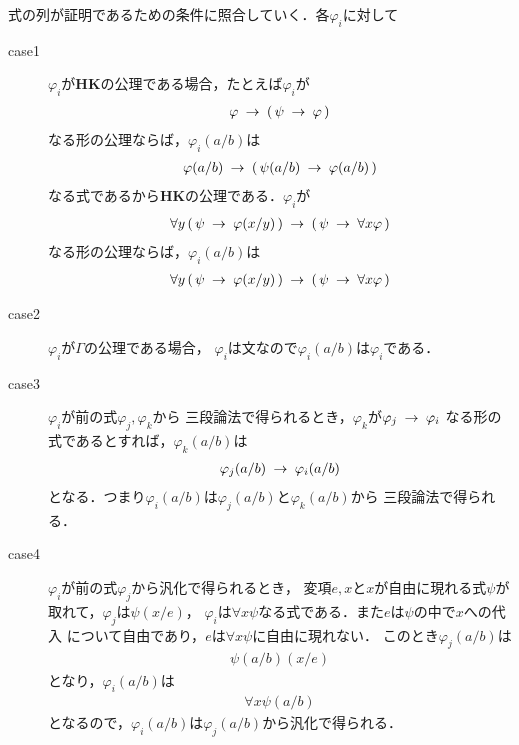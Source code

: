 	\begin{metaprf}
		式の列が証明であるための条件に照合していく．各$\varphi_{i}$に対して
		\begin{description}
			\item[case1] $\varphi_{i}$が{\bf HK}の公理である場合，たとえば$\varphi_{i}$が
				\begin{align}
					\varphi \hspace{0.25em}\rightarrow\hspace{0.25em} (\, \psi \hspace{0.25em}\rightarrow\hspace{0.25em} \varphi\, )
				\end{align}
				なる形の公理ならば，$\varphi_{i}(a/b)$は
				\begin{align}
					\varphi(a/b) \hspace{0.25em}\rightarrow\hspace{0.25em} (\, \psi(a/b) \hspace{0.25em}\rightarrow\hspace{0.25em} \varphi(a/b)\, )
				\end{align}
				なる式であるから{\bf HK}の公理である．$\varphi_{i}$が
				\begin{align}
					\forall y\, (\, \psi \hspace{0.25em}\rightarrow\hspace{0.25em} \varphi(x/y)\, )
					\hspace{0.25em}\rightarrow\hspace{0.25em} (\, \psi \hspace{0.25em}\rightarrow\hspace{0.25em} \forall x \varphi\, )
				\end{align}
				なる形の公理ならば，$\varphi_{i}(a/b)$は
				\begin{align}
					\forall y\, (\, \psi \hspace{0.25em}\rightarrow\hspace{0.25em} \varphi(x/y)\, )
					\hspace{0.25em}\rightarrow\hspace{0.25em} (\, \psi \hspace{0.25em}\rightarrow\hspace{0.25em} \forall x \varphi\, )
				\end{align}
				
			\item[case2] $\varphi_{i}$が$\Gamma$の公理である場合，
				$\varphi_{i}$は文なので$\varphi_{i}(a/b)$は$\varphi_{i}$である．
			
			\item[case3] $\varphi_{i}$が前の式$\varphi_{j},\varphi_{k}$から
				三段論法で得られるとき，$\varphi_{k}$が$\varphi_{j} \hspace{0.25em}\rightarrow\hspace{0.25em} \varphi_{i}$
				なる形の式であるとすれば，$\varphi_{k}(a/b)$は
				\begin{align}
					\varphi_{j}(a/b) \hspace{0.25em}\rightarrow\hspace{0.25em} \varphi_{i}(a/b)
				\end{align}
				となる．つまり$\varphi_{i}(a/b)$は$\varphi_{j}(a/b)$と$\varphi_{k}(a/b)$から
				三段論法で得られる．
				
			\item[case4] $\varphi_{i}$が前の式$\varphi_{j}$から汎化で得られるとき，
				変項$e,x$と$x$が自由に現れる式$\psi$が取れて，$\varphi_{j}$は$\psi(x/e)$，
				$\varphi_{i}$は$\forall x \psi$なる式である．また$e$は$\psi$の中で$x$への代入
				について自由であり，$e$は$\forall x \psi$に自由に現れない．
				このとき$\varphi_{j}(a/b)$は
				\begin{align}
					\psi(a/b)(x/e)
				\end{align}
				となり，$\varphi_{i}(a/b)$は
				\begin{align}
					\forall x \psi(a/b)
				\end{align}
				となるので，$\varphi_{i}(a/b)$は$\varphi_{j}(a/b)$から汎化で得られる．
				\QED
		\end{description}
	\end{metaprf}
	
